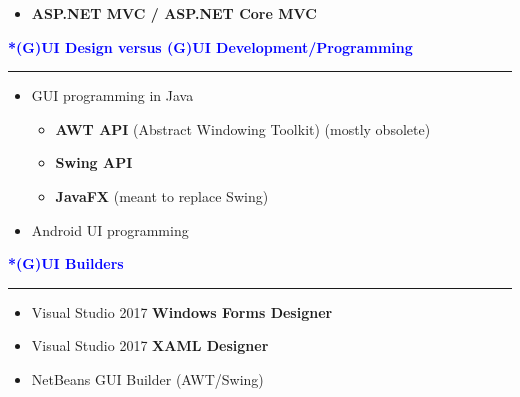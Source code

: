 \documentclass[pdf]{beamer}
\begin{document}
{{{{{{{{\begin{frame}
\begin{itemize}
\begin{itemize}
\item \textbf{ASP.NET MVC / ASP.NET Core MVC}

\end{itemize}
\end{itemize}

\end{frame}}



{
\begin{frame}
	\vspace{8mm}
	\textcolor{Blue}{\textbf{\Large{*(G)UI Design versus (G)UI Development/Programming}}}
    \textcolor{red}{\rule{10cm}{1mm}}

\begin{itemize}
\item GUI programming in Java
\begin{itemize}
\item \textbf{AWT API} (Abstract Windowing Toolkit) (mostly obsolete)
\newline

\item \textbf{Swing API}
\newline

\item \textbf{JavaFX} (meant to replace Swing)
\end{itemize}

\item Android UI programming
\end{itemize}

\end{frame}}



{
\begin{frame}
	\vspace{8mm}
	\textcolor{Blue}{\textbf{\Large{*(G)UI Builders}}}
    \textcolor{red}{\rule{10cm}{1mm}}

\begin{itemize}
\item Visual Studio 2017 \textbf{Windows Forms Designer}

\item Visual Studio 2017 \textbf{XAML Designer}

\item NetBeans GUI Builder (AWT/Swing)


\end{itemize}
\end{frame}}}}}}}}}
\end{document}
